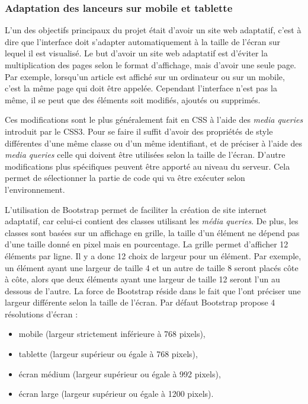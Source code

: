 \documentclass[12pt,a4paper]{article}
\begin{document}
\subsubsection{Adaptation des lanceurs sur mobile et tablette}
L'un des objectifs principaux du projet était d'avoir un site web adaptatif, c'est à dire que l'interface doit s'adapter automatiquement à la taille de l'écran sur lequel il est visualisé. Le but d'avoir un site web adaptatif est d'éviter la multiplication des pages selon le format d'affichage, mais d'avoir une seule page. Par exemple, lorsqu'un article est affiché sur un ordinateur ou sur un mobile, c'est la même page qui doit être appelée. Cependant l'interface n'est pas la même, il se peut que des éléments soit modifiés, ajoutés ou supprimés.\par 
Ces modifications sont le plus généralement fait en CSS à l'aide des \textit{media queries} introduit par le CSS3. Pour se faire il suffit d'avoir des propriétés de style différentes d'une même classe ou d'un même identifiant, et de préciser à l'aide des \textit{media queries} celle qui doivent être utilisées selon la taille de l'écran. D'autre modifications plus spécifiques peuvent être apporté au niveau du serveur. Cela permet de sélectionner la partie de code qui va être exécuter selon l'environnement.\par
\medskip
L'utilisation de Bootstrap permet de faciliter la création de site internet adaptatif, car celui-ci contient des classes utilisant les \textit{média queries}. De plus, les classes sont basées sur un affichage en grille, la taille d'un élément ne dépend pas d'une taille donné en pixel mais en pourcentage. La grille permet d'afficher 12 éléments par ligne. Il y a donc 12 choix de largeur pour un élément. Par exemple, un élément ayant une largeur de taille 4 et un autre de taille 8 seront placés côte à côte, alors que deux éléments ayant une largeur de taille 12 seront l'un au dessous de l'autre. La force de Bootstrap réside dans le fait que l'ont préciser une largeur différente selon la taille de l'écran. Par défaut Bootstrap propose 4 résolutions d'écran :
\begin{itemize}
\item mobile (largeur strictement inférieure à 768 pixels),
\item tablette (largeur supérieur ou égale à 768 pixels),
\item écran médium (largeur supérieur ou égale à 992 pixels),
\item écran large (largeur supérieur ou égale à 1200 pixels).
\end{itemize}
\end{document}
